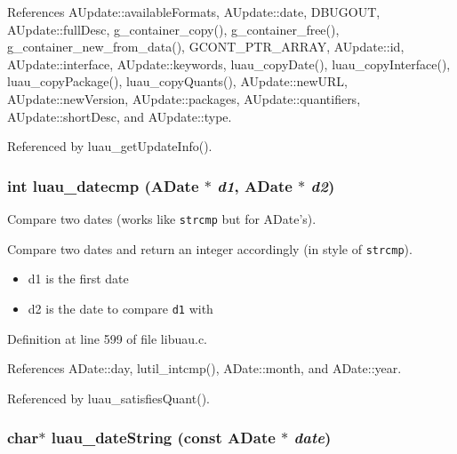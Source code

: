 References AUpdate::available\-Formats, AUpdate::date, DBUGOUT, AUpdate::full\-Desc, g\_\-container\_\-copy(), g\_\-container\_\-free(), g\_\-container\_\-new\_\-from\_\-data(), GCONT\_\-PTR\_\-ARRAY, AUpdate::id, AUpdate::interface, AUpdate::keywords, luau\_\-copy\-Date(), luau\_\-copy\-Interface(), luau\_\-copy\-Package(), luau\_\-copy\-Quants(), AUpdate::new\-URL, AUpdate::new\-Version, AUpdate::packages, AUpdate::quantifiers, AUpdate::short\-Desc, and AUpdate::type.

Referenced by luau\_\-get\-Update\-Info().
\subsubsection{\setlength{\rightskip}{0pt plus 5cm}int luau\_\-datecmp ({\bf ADate} $\ast$ {\em d1}, {\bf ADate} $\ast$ {\em d2})}\label{libuau_8c_a20}


Compare two dates (works like {\tt strcmp} but for ADate's). 

Compare two dates and return an integer accordingly (in style of {\tt strcmp}).

\begin{itemize}
\item d1 is the first date \item d2 is the date to compare {\tt d1} with 
\end{itemize}


Definition at line 599 of file libuau.c.

References ADate::day, lutil\_\-intcmp(), ADate::month, and ADate::year.

Referenced by luau\_\-satisfies\-Quant().
\subsubsection{\setlength{\rightskip}{0pt plus 5cm}char$\ast$ luau\_\-date\-String (const {\bf ADate} $\ast$ {\em date})}\label{libuau_8c_a18}


